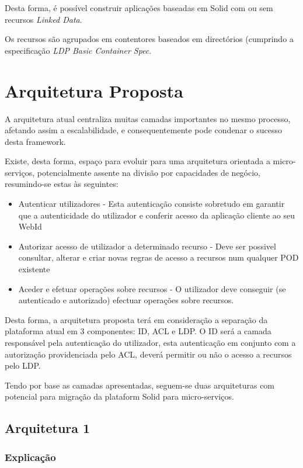 Desta forma, é possível construir aplicações baseadas em Solid com ou sem recursos \emph{Linked Data}.\cite{solid_spec}

Os recursos são agrupados em contentores baseados em directórios (cumprindo a especificação \emph{LDP Basic Container Spec}.\cite{solid_spec}

\section{Arquitetura Proposta}
A arquitetura atual centraliza muitas camadas importantes no mesmo processo, afetando assim a escalabilidade, e consequentemente pode condenar o sucesso desta framework.

Existe, desta forma, espaço para evoluir para uma arquitetura orientada a micro-serviços, potencialmente assente na divisão por capacidades de negócio, resumindo-se estas às seguintes:
\begin{itemize}
    \item  Autenticar utilizadores - Esta autenticação consiste sobretudo em garantir que a autenticidade do utilizador e conferir acesso da aplicação cliente ao seu WebId
    \item Autorizar acesso de utilizador a determinado recurso - Deve ser possivel consultar, alterar e criar novas regras de acesso a recursos num qualquer POD existente
    \item Aceder e efetuar operações sobre recursos - O utilizador deve conseguir (se autenticado e autorizado) efectuar operações sobre recursos.
\end{itemize}

Desta forma, a arquitetura proposta terá em consideração a separação da plataforma atual em 3 componentes: ID, ACL e LDP.
O ID será a camada responsável pela autenticação do utilizador, esta autenticação em conjunto com a autorização providenciada pelo ACL, deverá permitir ou não o acesso a recursos pelo LDP.

Tendo por base as camadas apresentadas, seguem-se duas arquiteturas com potencial para migração da plataform Solid para micro-serviços.

\subsection{Arquitetura 1}

\subsubsection{Explicação}

